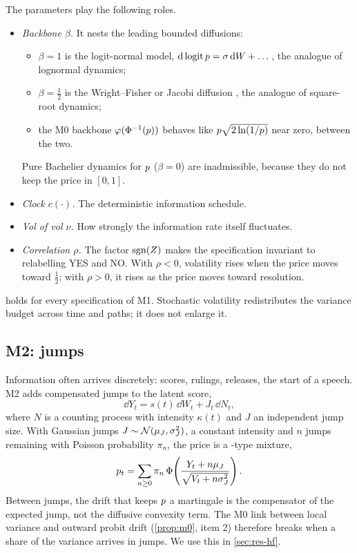 The parameters play the following roles.
\begin{itemize}
  \item \emph{Backbone $\beta$.} It nests the leading bounded diffusions:
  \begin{itemize}
    \item $\beta=1$ is the logit-normal model, $\mathrm{d}\,\mathrm{logit}\,p=\sigma\,\mathrm{d} W+\dots$, the
    analogue of lognormal dynamics;
    \item $\beta=\tfrac12$ is the Wright--Fisher or Jacobi diffusion \citep{karlintaylor1981}, the
    analogue of square-root dynamics;
    \item the M0 backbone $\varphi(\Phi^{-1}(p))$ behaves like $p\sqrt{2\ln(1/p)}$ near zero,
    between the two.
  \end{itemize}
  Pure Bachelier dynamics for $p$ ($\beta=0$) are inadmissible, because they do not keep the
  price in $[0,1]$.
  \item \emph{Clock $c(\cdot)$.} The deterministic information schedule.
  \item \emph{Vol of vol $\nu$.} How strongly the information rate itself fluctuates.
  \item \emph{Correlation $\rho$.} The factor $\operatorname{sgn}(Z)$ makes the specification invariant to
  relabelling YES and NO. With $\rho<0$, volatility rises when the price moves toward
  $\tfrac12$; with $\rho>0$, it rises as the price moves toward resolution.
\end{itemize}

 holds for every specification of M1. Stochastic volatility redistributes the
variance budget across time and paths; it does not enlarge it.

\subsection{M2: jumps}\label{sec:model-m2}

Information often arrives discretely: scores, rulings, releases, the start of a speech. M2 adds
compensated jumps to the latent score,
\begin{equation}\label{eq:m2}
  \dd Y_t=s(t)\,\dd W_t+J_t\,\dd N_t,
\end{equation}
where $N$ is a counting process with intensity $\kappa(t)$ and $J$ an independent jump size. With
Gaussian jumps $J\sim\mathcal{N}(\mu_J,\sigma_J^2)$, a constant intensity and $n$ jumps remaining with
Poisson probability $\pi_n$, the price is a \citet{merton1976}-type mixture,
\begin{equation}\label{eq:m2price}
  p_t=\sum_{n\ge0}\pi_n\,\Phi\!\left(\frac{Y_t+n\mu_J}{\sqrt{V_t+n\sigma_J^2}}\right).
\end{equation}
Between jumps, the drift that keeps $p$ a martingale is the compensator of the expected jump,
not the diffusive convexity term. The M0 link between local variance and outward probit drift
(\cref{prop:m0}, item 2) therefore breaks when a share of the variance arrives in jumps. We use
this in \cref{sec:res-hf}.


